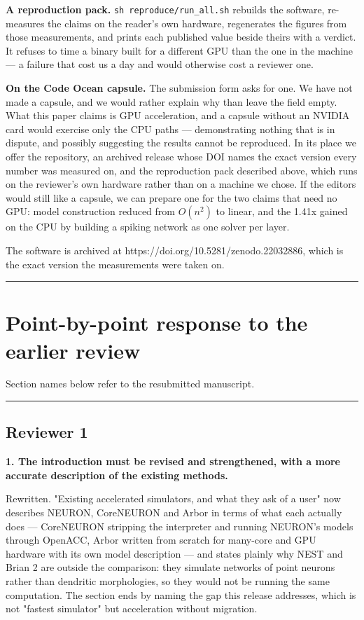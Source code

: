 \documentclass[11pt,a4paper]{article}
\begin{document}
\textbf{A reproduction pack.} \texttt{sh reproduce/run\_all.sh} rebuilds the software, re-measures the claims on the reader's own hardware, regenerates the figures from those measurements, and prints each published value beside theirs with a verdict. It refuses to time a binary built for a different GPU than the one in the machine --- a failure that cost us a day and would otherwise cost a reviewer one.

\textbf{On the Code Ocean capsule.} The submission form asks for one. We have not made a capsule, and we would rather explain why than leave the field empty. What this paper claims is GPU acceleration, and a capsule without an NVIDIA card would exercise only the CPU paths --- demonstrating nothing that is in dispute, and possibly suggesting the results cannot be reproduced. In its place we offer the repository, an archived release whose DOI names the exact version every number was measured on, and the reproduction pack described above, which runs on the reviewer's own hardware rather than on a machine we chose. If the editors would still like a capsule, we can prepare one for the two claims that need no GPU: model construction reduced from $O(n^2)$ to linear, and the 1.41x gained on the CPU by building a spiking network as one solver per layer.

The software is archived at https://doi.org/10.5281/zenodo.22032886, which is the exact version the measurements were taken on.

\medskip\hrule\medskip

\section*{Point-by-point response to the earlier review}

Section names below refer to the resubmitted manuscript.

\medskip\hrule\medskip

\subsection*{Reviewer 1}

\textbf{1. The introduction must be revised and strengthened, with a more accurate description of the existing methods.}

Rewritten. "Existing accelerated simulators, and what they ask of a user" now describes NEURON, CoreNEURON and Arbor in terms of what each actually does --- CoreNEURON stripping the interpreter and running NEURON's models through OpenACC, Arbor written from scratch for many-core and GPU hardware with its own model description --- and states plainly why NEST and Brian 2 are outside the comparison: they simulate networks of point neurons rather than dendritic morphologies, so they would not be running the same computation. The section ends by naming the gap this release addresses, which is not "fastest simulator" but acceleration without migration.
\end{document}
